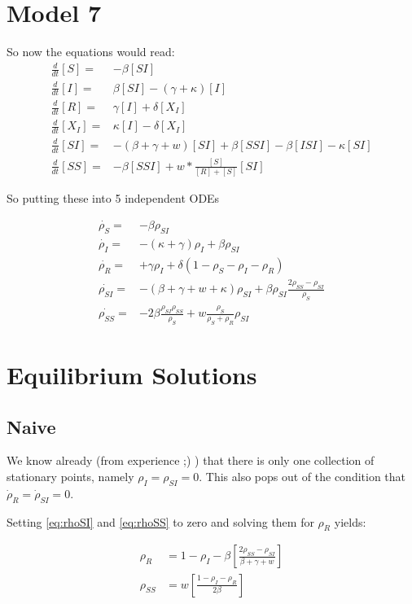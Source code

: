 \documentclass[a4paper,10pt]{article}
\begin{document}
\section{Model 7}


So now the equations would read:
\begin{align}
 \frac{d}{dt} [S]
 =&
 -\beta [SI] 
 \\
 \frac{d}{dt} [I]
 =&
 \beta [SI] - (\gamma + \kappa)[I] 
 \\
 \frac{d}{dt} [R]
 =&
\gamma [I] +\delta[X_I]
 \\
 \frac{d}{dt} [X_I]
 =&
\kappa[I] - \delta[X_I]
 \\
 \frac{d}{dt} [SI]
 =&
 -(\beta+\gamma+w)[SI] + \beta[SSI] -\beta[ISI] - \kappa [SI]
 \\
 \frac{d}{dt} [SS]
 =&
- \beta [SSI] + w*\frac{[S]}{[R]+[S]} [SI]
 \end{align}
 
 So putting these into 5 independent ODEs 
 
 
  \begin{align}
  \dot{\rho_S}=&-\beta \rho_{SI}\\ 
  \dot {\rho_{I}}= &
  -(\kappa+\gamma)\rho_{I} +\beta\rho_{SI}\\
  \dot{\rho_{R}}=&+
  \gamma\rho_I +\delta (1-\rho_{S}-\rho_{I}-\rho_{R})\\
  \dot{\rho_{SI}}=&
  -(\beta+\gamma+w+\kappa)\rho_{SI}+\beta\rho_{SI}\frac{2\rho_{SS}-\rho_{SI}}{\rho_S}\\
  \dot{\rho_{SS}}=& - 2\beta\frac{\rho_{SI}\rho_{SS}}{\rho_{S}}+w\frac{\rho_S}{\rho_S+\rho_{R}}\rho_{SI}
 \end{align}
 
\section{Equilibrium Solutions}
\subsection{Naive}

We know already (from experience ;) ) that there is only one collection of stationary points, namely $\rho_I=\rho_{SI}=0$. This also pops out of the condition that $\dot \rho_R=\dot\rho_{SI}=0$.

Setting \eqref{eq:rhoSI} and \eqref{eq:rhoSS} to zero and solving them for $\rho_R$ yields:

\begin{align}
 \rho_R &= 1- \rho_I - \beta\left[\frac{2\rho_{SS}-\rho_{SI}}{\beta+\gamma+w}\right]\\
 \rho_{SS}&= w\left[\frac{1-\rho_I-\rho_R}{2\beta}\right]
\end{align}
\end{document}
